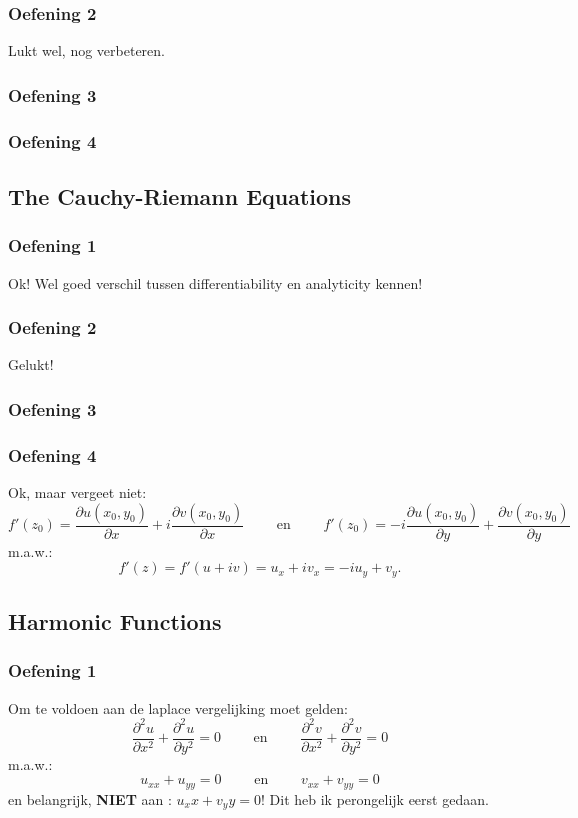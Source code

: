 \documentclass[a4paper,twoside]{article}
\theoremstyle{definition}
\theoremstyle{plain}
\begin{document}
\subsubsection{Oefening 2}
Lukt wel, nog verbeteren.
\subsubsection{Oefening 3}
\subsubsection{Oefening 4}
\subsection{The Cauchy-Riemann Equations}
\subsubsection{Oefening 1}
Ok! Wel goed verschil tussen differentiability en analyticity kennen!
\subsubsection{Oefening 2}
Gelukt!
\subsubsection{Oefening 3}
\subsubsection{Oefening 4}
Ok, maar vergeet niet:
\[
\boxed{f'(z_0) = \frac{\partial u(x_0, y_0)}{\partial x} + i\frac{\partial v(x_0, y_0)}{\partial x}}
\qquad \text{ en } \qquad
 \boxed{f'(z_0) = -i\frac{\partial u(x_0, y_0)}{\partial y} + \frac{\partial v(x_0, y_0)}{\partial y}}
 \]
 m.a.w.:
 \[
 f'(z) = f'(u+iv) = u_x + i v_x = -i u_y + v_y.
 \]
\subsection{Harmonic Functions}
\subsubsection{Oefening 1}
Om te voldoen aan de laplace vergelijking moet gelden:
\[
\frac{\partial^2 u}{\partial x^2} + \frac{\partial^2 u}{\partial y^2} = 0
\qquad \text{ en } \qquad
\frac{\partial^2 v}{\partial x^2} + \frac{\partial^2 v}{\partial y^2} = 0
\]
m.a.w.:
\[
u_{xx} + u_{yy} = 0 \qquad \text{ en } \qquad v_{xx} + v_{yy} = 0
\]
en belangrijk, \textbf{NIET} aan : \(u_xx + v_yy = 0\)! Dit heb ik perongelijk eerst gedaan.
\end{document}

